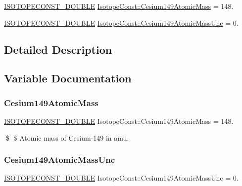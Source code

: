 \begin{DoxyCompactItemize}
\item 
\mbox{\hyperlink{group___isotope_const-_macros_ga8f45a7272ce02c0b4c65c44636ed719a}{I\+S\+O\+T\+O\+P\+E\+C\+O\+N\+S\+T\+\_\+\+D\+O\+U\+B\+LE}} \mbox{\hyperlink{group___isotope_const-_cesium-_cs149_gafcf7dca1b2e9a2018fe2bdb308f1ceb6}{Isotope\+Const\+::\+Cesium149\+Atomic\+Mass}} = 148.
\item 
\mbox{\hyperlink{group___isotope_const-_macros_ga8f45a7272ce02c0b4c65c44636ed719a}{I\+S\+O\+T\+O\+P\+E\+C\+O\+N\+S\+T\+\_\+\+D\+O\+U\+B\+LE}} \mbox{\hyperlink{group___isotope_const-_cesium-_cs149_ga4c0bfed5b64fc9a26426cc8de80f4a76}{Isotope\+Const\+::\+Cesium149\+Atomic\+Mass\+Unc}} = 0.
\end{DoxyCompactItemize}


\subsection{Detailed Description}


\subsection{Variable Documentation}
\mbox{\label{group___isotope_const-_cesium-_cs149_gafcf7dca1b2e9a2018fe2bdb308f1ceb6}} 
\subsubsection{\texorpdfstring{Cesium149\+Atomic\+Mass}{Cesium149AtomicMass}}
{\footnotesize\ttfamily \mbox{\hyperlink{group___isotope_const-_macros_ga8f45a7272ce02c0b4c65c44636ed719a}{I\+S\+O\+T\+O\+P\+E\+C\+O\+N\+S\+T\+\_\+\+D\+O\+U\+B\+LE}} Isotope\+Const\+::\+Cesium149\+Atomic\+Mass = 148.}

\$ \$ Atomic mass of Cesium-\/149 in amu. \mbox{\label{group___isotope_const-_cesium-_cs149_ga4c0bfed5b64fc9a26426cc8de80f4a76}} 
\subsubsection{\texorpdfstring{Cesium149\+Atomic\+Mass\+Unc}{Cesium149AtomicMassUnc}}
{\footnotesize\ttfamily \mbox{\hyperlink{group___isotope_const-_macros_ga8f45a7272ce02c0b4c65c44636ed719a}{I\+S\+O\+T\+O\+P\+E\+C\+O\+N\+S\+T\+\_\+\+D\+O\+U\+B\+LE}} Isotope\+Const\+::\+Cesium149\+Atomic\+Mass\+Unc = 0.}

